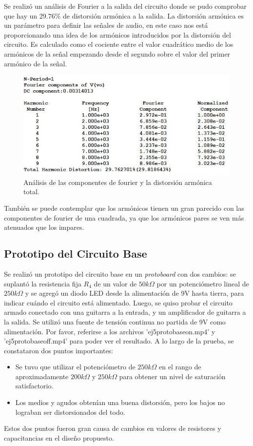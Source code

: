 Se realizó un análisis de Fourier a la salida del circuito donde se pudo comprobar que hay un $29.76\%$ de distorsión armónica a la salida. La distorsión armónica es un parámetro para definir las señales de audio, en este caso nos está proporcionando una idea de los armónicos introducidos por la distorsión del circuito. Es calculado como el cociente entre el valor cuadrático medio de los armónicos de la señal empezando desde el segundo sobre el valor del primer armónico de la señal.
\begin{figure}[H]
	\centering
	\includegraphics[width=1\textwidth, trim={0 0 0 0}, clip]{Ejercicio5/Imagenes/Circuito_base/Sim/sim_base_fourier.JPG}
	\caption{Análisis de las componentes de fourier y la distorsión armónica total.}
	\label{fig:sim_base_fourier}
\end{figure}
También se puede contemplar que los armónicos tienen un gran parecido con las componentes de fourier de una cuadrada, ya que los armónicos pares se ven más atenuados que los impares.

\subsection{Prototipo del Circuito Base}
Se realizó un prototipo del circuito base en un \textit{protoboard} con dos cambios: se suplantó la resistencia fija $R_4$ de un valor de $50k\Omega$ por un potenciómetro lineal de $250k\Omega$ y se agregó un diodo LED desde la alimentación de 9V hasta tierra, para indicar cuándo el circuito está alimentado. Luego, se quiso probar el circuito armado conectado con una guitarra a la entrada, y un amplificador de guitarra a la salida. Se utilizó una fuente de tensión continua no partida de 9V como alimentación. Por favor, referirse a los archivos 'ej5protobaseon.mp4' y 'ej5protobaseoff.mp4' para poder ver el resultado.
A lo largo de la prueba, se constataron dos puntos importantes:
\begin{itemize}
\item Se tuvo que utilizar el potenciómetro de $250k\Omega$ en el rango de aproximadamente $200k\Omega$ y $250k\Omega$ para obtener un nivel de saturación satisfactorio.
\item Los medios y agudos obtenían una buena distorsión, pero los bajos no lograban ser distorsionados del todo.
\end{itemize}
Estos dos puntos fueron gran causa de cambios en valores de resistores y capacitancias en el diseño propuesto.

